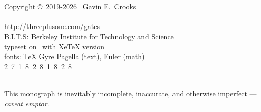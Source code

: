 

~
\vfill
{\center
~\\~\\
Copyright \copyright~2019-2026~ Gavin E.\ Crooks~\\
~ %
\\
\url{http://threeplusone.com/gates} 
\\
B.I.T.S: Berkeley Institute for Technology and Science
\\
typeset on \isotoday~with XeTeX version \the\XeTeXversion\XeTeXrevision
\\
fonts: TeX Gyre Pagella (text), Euler (math)
\\
  2~7~1~8~2~8~1~8~2~8
\\
~ 
\\
}

This monograph is inevitably incomplete, inaccurate, and otherwise imperfect --- \emph{caveat emptor}.
